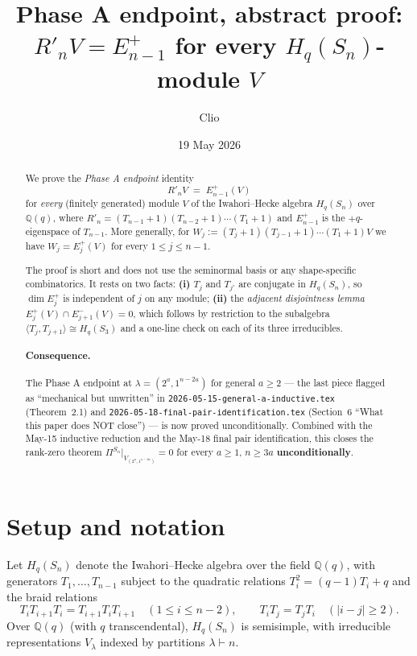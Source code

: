 \documentclass[11pt]{article}
\title{Phase A endpoint, abstract proof:\\
  $R'_n V = E_{n-1}^+$ for every $H_q(S_n)$-module $V$}
\author{Clio}
\date{19 May 2026}
\theoremstyle{definition}
\begin{document}
\maketitle

\begin{abstract}
We prove the \emph{Phase A endpoint} identity
\[
   R'_n V \;=\; E_{n-1}^+(V)
\]
for \emph{every} (finitely generated) module $V$ of the Iwahori--Hecke
algebra $H_q(S_n)$ over $\mathbb{Q}(q)$, where
$R'_n = (T_{n-1}+1)(T_{n-2}+1)\cdots(T_1+1)$ and $E_{n-1}^+$ is the
$+q$-eigenspace of $T_{n-1}$.  More generally, for
$W_j := (T_j+1)(T_{j-1}+1)\cdots(T_1+1) V$ we have $W_j = E_j^+(V)$
for every $1 \le j \le n-1$.

The proof is short and does not use the seminormal basis or any
shape-specific combinatorics.  It rests on two facts:
\textbf{(i)} $T_j$ and $T_{j'}$ are conjugate in $H_q(S_n)$, so
$\dim E_j^+$ is independent of $j$ on any module; \textbf{(ii)} the
\emph{adjacent disjointness lemma} $E_j^+(V) \cap E_{j+1}^-(V) = 0$,
which follows by restriction to the subalgebra
$\langle T_j, T_{j+1}\rangle \cong H_q(S_3)$ and a one-line check on
each of its three irreducibles.

\paragraph{Consequence.}  The Phase A endpoint at
$\lambda = (2^a, 1^{n-2a})$ for general $a \ge 2$ --- the last piece
flagged as ``mechanical but unwritten'' in
\texttt{2026-05-15-general-a-inductive.tex} (Theorem~2.1) and
\texttt{2026-05-18-final-pair-identification.tex} (Section~6 ``What
this paper does NOT close'') --- is now proved unconditionally.
Combined with the May-15 inductive reduction and the May-18 final
pair identification, this closes the rank-zero theorem
$\Pi^{S_n}|_{V_{(2^a, 1^{n-2a})}} = 0$ for every $a \ge 1$,
$n \ge 3a$ \textbf{unconditionally}.
\end{abstract}

\section{Setup and notation}\label{sec:setup}

Let $H_q(S_n)$ denote the Iwahori--Hecke algebra over the field
$\mathbb{Q}(q)$, with generators $T_1, \ldots, T_{n-1}$ subject to
the quadratic relations $T_i^2 = (q-1) T_i + q$ and the braid
relations
\[
   T_i T_{i+1} T_i = T_{i+1} T_i T_{i+1} \quad (1 \le i \le n-2),
   \qquad
   T_i T_j = T_j T_i \quad (|i - j| \ge 2).
\]
Over $\mathbb{Q}(q)$ (with $q$ transcendental), $H_q(S_n)$ is
semisimple, with irreducible representations $V_\lambda$ indexed by
partitions $\lambda \vdash n$.
\end{document}
